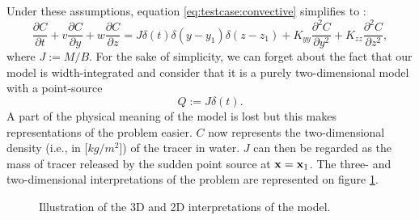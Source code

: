 Under these assumptions, equation \eqref{eq:testcase:convective} simplifies to :
\begin{equation} \label{eq:testcase}
	\frac{\partial C}{\partial t} + v \frac{\partial C}{\partial y} + w \frac{\partial C}{\partial z} = J \delta(t) \delta(y - y_1)\delta(z-z_1) + K_{yy} \frac{\partial^2 C}{\partial y^2} + K_{zz} \frac{\partial^2 C}{\partial z^2},
\end{equation}
where $J := M/B$.
For the sake of simplicity, we can forget about the fact that our model is width-integrated and consider that it is a purely two-dimensional model with a point-source
\begin{equation}
	Q := J\delta(t).
\end{equation}
A part of the physical meaning of the model is lost but this makes representations of the problem easier. $C$ now represents the two-dimensional density (i.e., in [$kg/m^2$]) of the tracer in water. $J$ can then be regarded as the mass of tracer released by the sudden point source at $\mathbf x = \mathbf x_1$. The three- and two-dimensional interpretations of the problem are represented on figure \ref{fig:testcase_scheme}.
\begin{figure}[H]
	\centering
	\scalebox{.8}{}
	\scalebox{.8}{}
	\caption{Illustration of the 3D and 2D interpretations of the model.}
    \label{fig:testcase_scheme}
\end{figure}


